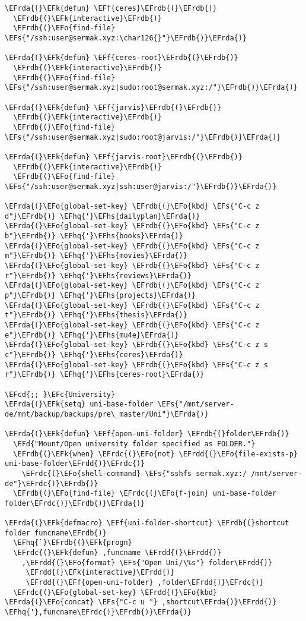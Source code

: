 \documentclass[a4wide,10pt]{article}
\newcommand{\EFc}[1]{\textcolor{EFc}{#1}} %
\newcommand{\EFcd}[1]{\textcolor{EFcd}{#1}} %
\newcommand{\EFs}[1]{\textcolor{EFs}{#1}} %
\newcommand{\EFd}[1]{\textcolor{EFd}{#1}} %
\newcommand{\EFk}[1]{\textcolor{EFk}{#1}} %
\newcommand{\EFf}[1]{\textcolor{EFf}{#1}} %
\newcommand{\EFo}[1]{\textcolor{EFo}{#1}} %
\newcommand{\EFhq}[1]{\textcolor{EFhq}{#1}} %
\newcommand{\EFhs}[1]{\textcolor{EFhs}{#1}} %
\newcommand{\EFrda}[1]{\textcolor{EFrda}{#1}} %
\newcommand{\EFrdb}[1]{\textcolor{EFrdb}{#1}} %
\newcommand{\EFrdc}[1]{\textcolor{EFrdc}{#1}} %
\newcommand{\EFrdd}[1]{\textcolor{EFrdd}{#1}} %
\begin{document}
\begin{Code}
\begin{Verbatim}
\EFrda{(}\EFk{defun} \EFf{ceres}\EFrdb{(}\EFrdb{)}
  \EFrdb{(}\EFk{interactive}\EFrdb{)}
  \EFrdb{(}\EFo{find-file} \EFs{"/ssh:user@sermak.xyz:\char126{}"}\EFrdb{)}\EFrda{)}

\EFrda{(}\EFk{defun} \EFf{ceres-root}\EFrdb{(}\EFrdb{)}
  \EFrdb{(}\EFk{interactive}\EFrdb{)}
  \EFrdb{(}\EFo{find-file} \EFs{"/ssh:user@sermak.xyz|sudo:root@sermak.xyz:/"}\EFrdb{)}\EFrda{)}

\EFrda{(}\EFk{defun} \EFf{jarvis}\EFrdb{(}\EFrdb{)}
  \EFrdb{(}\EFk{interactive}\EFrdb{)}
  \EFrdb{(}\EFo{find-file} \EFs{"/ssh:user@sermak.xyz|sudo:root@jarvis:/"}\EFrdb{)}\EFrda{)}

\EFrda{(}\EFk{defun} \EFf{jarvis-root}\EFrdb{(}\EFrdb{)}
  \EFrdb{(}\EFk{interactive}\EFrdb{)}
  \EFrdb{(}\EFo{find-file} \EFs{"/ssh:user@sermak.xyz|ssh:user@jarvis:/"}\EFrdb{)}\EFrda{)}

\EFrda{(}\EFo{global-set-key} \EFrdb{(}\EFo{kbd} \EFs{"C-c z d"}\EFrdb{)} \EFhq{'}\EFhs{dailyplan}\EFrda{)}
\EFrda{(}\EFo{global-set-key} \EFrdb{(}\EFo{kbd} \EFs{"C-c z b"}\EFrdb{)} \EFhq{'}\EFhs{books}\EFrda{)}
\EFrda{(}\EFo{global-set-key} \EFrdb{(}\EFo{kbd} \EFs{"C-c z m"}\EFrdb{)} \EFhq{'}\EFhs{movies}\EFrda{)}
\EFrda{(}\EFo{global-set-key} \EFrdb{(}\EFo{kbd} \EFs{"C-c z r"}\EFrdb{)} \EFhq{'}\EFhs{reviews}\EFrda{)}
\EFrda{(}\EFo{global-set-key} \EFrdb{(}\EFo{kbd} \EFs{"C-c z p"}\EFrdb{)} \EFhq{'}\EFhs{projects}\EFrda{)}
\EFrda{(}\EFo{global-set-key} \EFrdb{(}\EFo{kbd} \EFs{"C-c z t"}\EFrdb{)} \EFhq{'}\EFhs{thesis}\EFrda{)}
\EFrda{(}\EFo{global-set-key} \EFrdb{(}\EFo{kbd} \EFs{"C-c z e"}\EFrdb{)} \EFhq{'}\EFhs{mu4e}\EFrda{)}
\EFrda{(}\EFo{global-set-key} \EFrdb{(}\EFo{kbd} \EFs{"C-c z s c"}\EFrdb{)} \EFhq{'}\EFhs{ceres}\EFrda{)}
\EFrda{(}\EFo{global-set-key} \EFrdb{(}\EFo{kbd} \EFs{"C-c z s r"}\EFrdb{)} \EFhq{'}\EFhs{ceres-root}\EFrda{)}

\EFcd{;; }\EFc{University}
\EFrda{(}\EFk{setq} uni-base-folder \EFs{"/mnt/server-de/mnt/backup/backups/pre\_master/Uni"}\EFrda{)}

\EFrda{(}\EFk{defun} \EFf{open-uni-folder} \EFrdb{(}folder\EFrdb{)}
  \EFd{"Mount/Open university folder specified as FOLDER."}
  \EFrdb{(}\EFk{when} \EFrdc{(}\EFo{not} \EFrdd{(}\EFo{file-exists-p} uni-base-folder\EFrdd{)}\EFrdc{)}
    \EFrdc{(}\EFo{shell-command} \EFs{"sshfs sermak.xyz:/ /mnt/server-de"}\EFrdc{)}\EFrdb{)}
  \EFrdb{(}\EFo{find-file} \EFrdc{(}\EFo{f-join} uni-base-folder folder\EFrdc{)}\EFrdb{)}\EFrda{)}

\EFrda{(}\EFk{defmacro} \EFf{uni-folder-shortcut} \EFrdb{(}shortcut folder funcname\EFrdb{)}
  \EFhq{`}\EFrdb{(}\EFk{progn}
  \EFrdc{(}\EFk{defun} ,funcname \EFrdd{(}\EFrdd{)}
    ,\EFrdd{(}\EFo{format} \EFs{"Open Uni/\%s"} folder\EFrdd{)}
     \EFrdd{(}\EFk{interactive}\EFrdd{)}
     \EFrdd{(}\EFf{open-uni-folder} ,folder\EFrdd{)}\EFrdc{)}
  \EFrdc{(}\EFo{global-set-key} \EFrdd{(}\EFo{kbd} \EFrda{(}\EFo{concat} \EFs{"C-c u "} ,shortcut\EFrda{)}\EFrdd{)} \EFhq{'},funcname\EFrdc{)}\EFrdb{)}\EFrda{)}


\end{Verbatim}
\end{Code}
\end{document}
